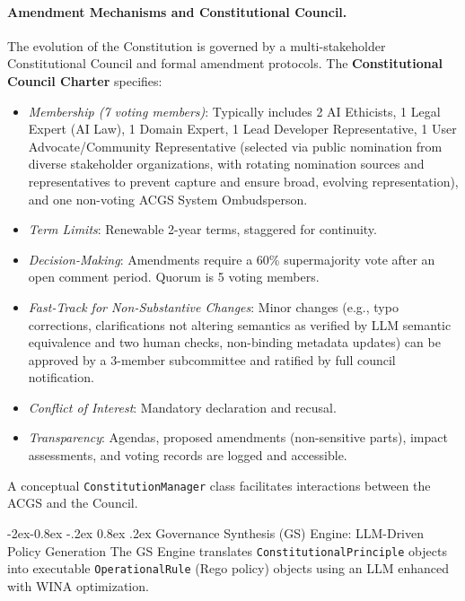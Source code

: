 \documentclass[manuscript,screen,9pt]{acmart}
\makeatletter
\renewcommand\subsubsection{\@startsection{subsubsection}{3}{\z@}%
  {-2ex\@plus -0.8ex \@minus -.2ex}%
  {0.8ex \@plus .2ex}%
  {\normalfont\normalsize\bfseries}}
\makeatother
\begin{document}
\paragraph{Amendment Mechanisms and Constitutional Council.} The evolution of the Constitution is governed by a multi-stakeholder Constitutional Council and formal amendment protocols.
The \textbf{Constitutional Council Charter} specifies:
\begin{itemize}[leftmargin=*,itemsep=1pt,parsep=1pt]
    \item \textit{Membership (7 voting members)}: Typically includes 2 AI Ethicists, 1 Legal Expert (AI Law), 1 Domain Expert, 1 Lead Developer Representative, 1 User Advocate/Community Representative (selected via public nomination from diverse stakeholder organizations, with rotating nomination sources and representatives to prevent capture and ensure broad, evolving representation), and one non-voting ACGS System Ombudsperson.
    \item \textit{Term Limits}: Renewable 2-year terms, staggered for continuity.
    \item \textit{Decision-Making}: Amendments require a 60\% supermajority vote after an open comment period. Quorum is 5 voting members.
    \item \textit{Fast-Track for Non-Substantive Changes}: Minor changes (e.g., typo corrections, clarifications not altering semantics as verified by LLM semantic equivalence and two human checks, non-binding metadata updates) can be approved by a 3-member subcommittee and ratified by full council notification.
    \item \textit{Conflict of Interest}: Mandatory declaration and recusal.
    \item \textit{Transparency}: Agendas, proposed amendments (non-sensitive parts), impact assessments, and voting records are logged and accessible.
\end{itemize}
A conceptual \texttt{ConstitutionManager} class facilitates interactions between the ACGS and the Council.

\subsubsection{Governance Synthesis (GS) Engine: LLM-Driven Policy Generation}
\label{subsubsec:gs_engine_layer}
The GS Engine translates \texttt{ConstitutionalPrinciple} objects into executable \texttt{OperationalRule} (Rego policy) objects using an LLM enhanced with WINA optimization.
\end{document}

